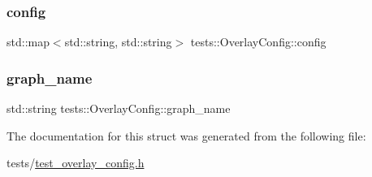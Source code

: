 \subsubsection{\texorpdfstring{config}{config}}
{\footnotesize\ttfamily std\+::map$<$std\+::string, std\+::string$>$ tests\+::\+Overlay\+Config\+::config}

\mbox{\label{structtests_1_1OverlayConfig_a689d5f8a0c184b90d2efc491014c8d1e}} 
\subsubsection{\texorpdfstring{graph\+\_\+name}{graph\_name}}
{\footnotesize\ttfamily std\+::string tests\+::\+Overlay\+Config\+::graph\+\_\+name}



The documentation for this struct was generated from the following file\+:\begin{DoxyCompactItemize}
\item 
tests/\hyperlink{test__overlay__config_8h}{test\+\_\+overlay\+\_\+config.\+h}\end{DoxyCompactItemize}
